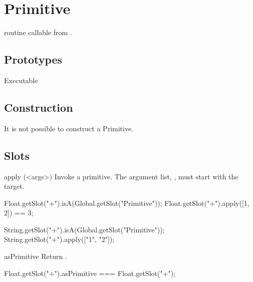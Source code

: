 
\section{Primitive}
\Cxx routine callable from \us.

\subsection{Prototypes}
\begin{refObjects}
\item[Executable]
\end{refObjects}

\subsection{Construction}

It is not possible to construct a Primitive.

\subsection{Slots}

\begin{urbiscriptapi}
\item[apply](<args>)%
  Invoke a primitive.  The argument list, , must start with
  the target.
\begin{urbiassert}
Float.getSlot("+").isA(Global.getSlot("Primitive"));
Float.getSlot("+").apply([1, 2]) == 3;

String.getSlot("+").isA(Global.getSlot("Primitive"));
String.getSlot("+").apply(["1", "2"]);
\end{urbiassert}

\item[asPrimitive] Return \this.
\begin{urbiassert}
Float.getSlot("+").asPrimitive === Float.getSlot("+");
\end{urbiassert}
\end{urbiscriptapi}


